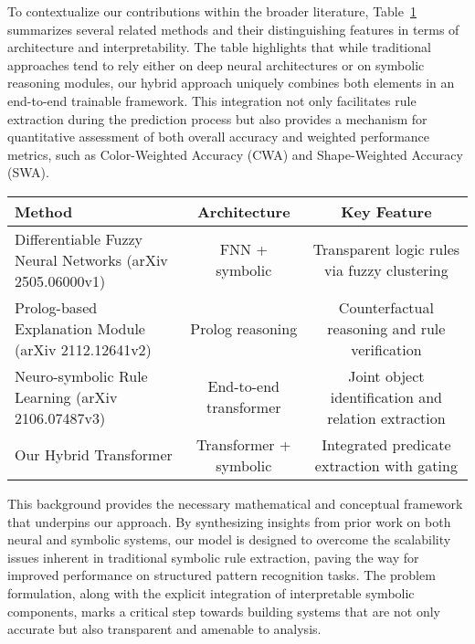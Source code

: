 \documentclass{article}
\begin{document}
To contextualize our contributions within the broader literature, Table~\ref{tab:background} summarizes several related methods and their distinguishing features in terms of architecture and interpretability. The table highlights that while traditional approaches tend to rely either on deep neural architectures or on symbolic reasoning modules, our hybrid approach uniquely combines both elements in an end-to-end trainable framework. This integration not only facilitates rule extraction during the prediction process but also provides a mechanism for quantitative assessment of both overall accuracy and weighted performance metrics, such as Color-Weighted Accuracy (CWA) and Shape-Weighted Accuracy (SWA).

\begin{table}[h]
\centering
\begin{tabular}{lcc}
\hline
Method & Architecture & Key Feature \\
\hline
Differentiable Fuzzy Neural Networks (arXiv 2505.06000v1) & FNN + symbolic & Transparent logic rules via fuzzy clustering \\
Prolog-based Explanation Module (arXiv 2112.12641v2) & Prolog reasoning & Counterfactual reasoning and rule verification \\
Neuro-symbolic Rule Learning (arXiv 2106.07487v3) & End-to-end transformer & Joint object identification and relation extraction \\
Our Hybrid Transformer & Transformer + symbolic & Integrated predicate extraction with gating \\
\hline
\end{tabular}
\label{tab:background}
\end{table}

This background provides the necessary mathematical and conceptual framework that underpins our approach. By synthesizing insights from prior work on both neural and symbolic systems, our model is designed to overcome the scalability issues inherent in traditional symbolic rule extraction, paving the way for improved performance on structured pattern recognition tasks. The problem formulation, along with the explicit integration of interpretable symbolic components, marks a critical step towards building systems that are not only accurate but also transparent and amenable to analysis.
\end{document}
